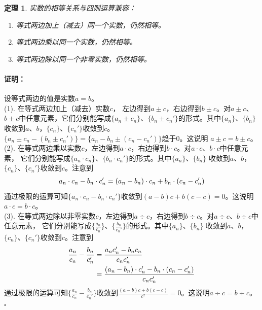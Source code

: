 \documentclass[12pt,UTF8]{ctexbook}
\newtheorem{tm}{定理}[section]
\renewenvironment{proof}{\paragraph{\textbf{证明：}}}{\hfill$\square$}
\begin{document}
\begin{appendix}
\begin{tm}\label{tm:a-1-25}
    实数的相等关系与四则运算兼容：
    \begin{enumerate}
        \item 等式两边加上（减去）同一个实数，仍然相等。
        \item 等式两边乘以同一个实数，仍然相等。
        \item 等式两边除以同一个非零实数，仍然相等。
    \end{enumerate}
\end{tm}
\begin{proof}
    设等式两边的值是实数$a=b$。\\
    (1). 在等式两边加上（减去）实数$c$，
    左边得到$a\pm c$，右边得到$b\pm c$。对$a\pm c$、$b\pm c$中任意元素，它们分别能写成$\{a_n\pm c_n\}$、$\{b_n\pm c_n'\}$的形式。其中$\{a_n\}$、$\{b_n\}$
    收敛到$a$、$b$，$\{c_n\}$、$\{c_n'\}$收敛到$c$。$\{a_n\pm c_n-(b_n\pm c_n')\} = \{a_n - b_n \pm  (c_n - c_n')\}$趋于$0$。这说明
    $a\pm c = b\pm c$。\\
    (2). 在等式两边乘以实数$c$，左边得到$a\cdot c$，右边得到$b\cdot c$。对$a\cdot c$、$b\cdot c$中任意元素，
    它们分别能写成$\{a_n\cdot c_n\}$、$\{b_n\cdot c_n'\}$的形式。其中$\{a_n\}$、$\{b_n\}$
    收敛到$a$、$b$，$\{c_n\}$、$\{c_n'\}$收敛到$c$。注意到
    \begin{align}
        a_n\cdot c_n - b_n\cdot c_n' &= (a_n - b_n)\cdot c_n + b_n\cdot(c_n - c_n') \notag \\
    \end{align}
    通过极限的运算可知$\{a_n\cdot c_n - b_n\cdot c_n'\}$收敛到$(a - b)c + b(c - c) = 0$。这说明$a\cdot c = b\cdot c$。\\
    (3). 在等式两边除以非零实数$c$，左边得到$a\div c$，右边得到$b\div c$。对$a\div c$、$b\div c$中任意元素，
    它们分别能写成$\{\frac{a_n}{c_n}\}$、$\{\frac{b_n}{c_n'}\}$的形式。其中$\{a_n\}$、$\{b_n\}$
    收敛到$a$、$b$，$\{c_n\}$、$\{c_n'\}$收敛到$c$。注意到
    \begin{align}
        \frac{a_n}{c_n} - \frac{b_n}{c_n'} &= \frac{a_nc_n' - b_nc_n}{c_nc_n'} \notag \\
        &= \frac{(a_n - b_n)\cdot c_n' - b_n\cdot(c_n - c_n')}{c_nc_n'}
    \end{align}
    通过极限的运算可知$\{\frac{a_n}{c_n} - \frac{b_n}{c_n'}\}$收敛到$\frac{(a - b)c + b(c - c)}{c^2} = 0$。这说明$a\div c = b\div c$。\\
\end{proof}


\end{appendix}
\end{document}
